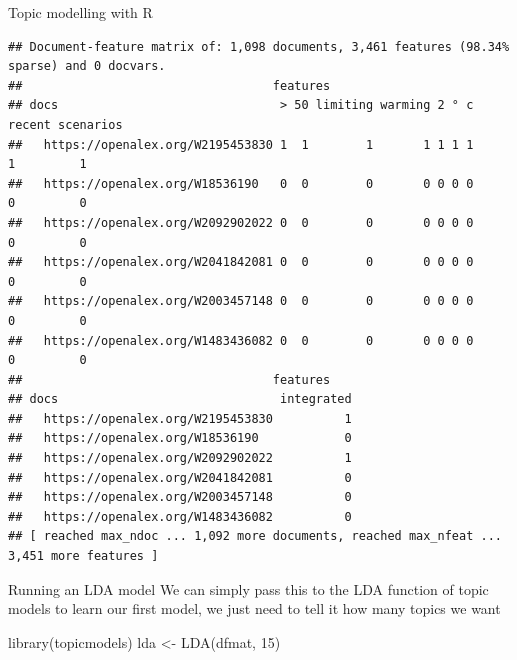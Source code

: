 \documentclass[
  10pt,
  ignorenonframetext,
  aspectratio=169]{beamer}
\newenvironment{Shaded}{\begin{snugshade}}{\end{snugshade}}
\newcommand{\DecValTok}[1]{\textcolor[rgb]{0.86,0.86,0.80}{#1}}
\newcommand{\FunctionTok}[1]{\textcolor[rgb]{0.94,0.94,0.56}{#1}}
\newcommand{\NormalTok}[1]{\textcolor[rgb]{0.80,0.80,0.80}{#1}}
\newcommand{\OtherTok}[1]{\textcolor[rgb]{0.94,0.94,0.56}{#1}}
\begin{document}
\begin{frame}[fragile]{Topic modelling with R}
\begin{verbatim}
## Document-feature matrix of: 1,098 documents, 3,461 features (98.34% sparse) and 0 docvars.
##                                   features
## docs                               > 50 limiting warming 2 ° c recent scenarios
##   https://openalex.org/W2195453830 1  1        1       1 1 1 1      1         1
##   https://openalex.org/W18536190   0  0        0       0 0 0 0      0         0
##   https://openalex.org/W2092902022 0  0        0       0 0 0 0      0         0
##   https://openalex.org/W2041842081 0  0        0       0 0 0 0      0         0
##   https://openalex.org/W2003457148 0  0        0       0 0 0 0      0         0
##   https://openalex.org/W1483436082 0  0        0       0 0 0 0      0         0
##                                   features
## docs                               integrated
##   https://openalex.org/W2195453830          1
##   https://openalex.org/W18536190            0
##   https://openalex.org/W2092902022          1
##   https://openalex.org/W2041842081          0
##   https://openalex.org/W2003457148          0
##   https://openalex.org/W1483436082          0
## [ reached max_ndoc ... 1,092 more documents, reached max_nfeat ... 3,451 more features ]
\end{verbatim}
\end{frame}

\begin{frame}[fragile]{Running an LDA model}
\protect\hypertarget{running-an-lda-model}{}
We can simply pass this to the LDA function of topic models to learn our
first model, we just need to tell it how many topics we want

\medskip
\scriptsize

\begin{Shaded}
\begin{Highlighting}[]
\FunctionTok{library}\NormalTok{(topicmodels)}
\NormalTok{lda }\OtherTok{\textless{}{-}} \FunctionTok{LDA}\NormalTok{(dfmat, }\DecValTok{15}\NormalTok{)}
\end{Highlighting}
\end{Shaded}
\end{frame}
\end{document}
